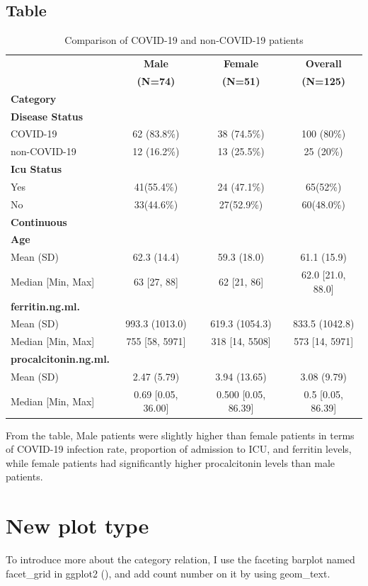 \documentclass[a4paper, 12pt, one column]{article}
\begin{document}
\subsection{Table}
\begin{table}[h!]
\centering
\caption*{Comparison of COVID-19 and non-COVID-19 patients}
\begin{tabular}{lccc}
\toprule
& \textbf{Male} & \textbf{Female} & \textbf{Overall} \\
 & \textbf{(N=74)} & \textbf{(N=51)} & \textbf{(N=125)} \\
\textbf{Category} & & &\\
\midrule
 \textbf{Disease Status} & & &\\
\midrule
COVID-19 & 62 (83.8\%)& 38 (74.5\%) & 100 (80\%) \\
non-COVID-19 & 12 (16.2\%)& 13 (25.5\%) & 25 (20\%) \\
\midrule
\textbf{Icu Status} & & & \\
Yes& 41(55.4\%)& 24 (47.1\%)& 65(52\%)\\
No& 33(44.6\%)& 27(52.9\%)& 60(48.0\%)\\
\midrule
\textbf{Continuous} & & &\\
\midrule
\textbf{Age} & & & \\
Mean (SD) & 62.3 (14.4) & 59.3 (18.0) & 61.1 (15.9) \\
Median [Min, Max] & 63 [27, 88] & 62 [21, 86] & 62.0 [21.0, 88.0] \\
\midrule
\textbf{ferritin.ng.ml.} & & & \\
Mean (SD) & 993.3 (1013.0)& 619.3 (1054.3)& 833.5 (1042.8)\\
Median [Min, Max] & 755 [58, 5971]& 318 [14, 5508]& 573 [14, 5971]\\
\midrule
\textbf{procalcitonin.ng.ml.} & & & \\
Mean (SD) & 2.47 (5.79)& 3.94 (13.65)& 3.08 (9.79)\\
Median [Min, Max] & 0.69 [0.05, 36.00]& 0.500 [0.05, 86.39]& 0.5 [0.05, 86.39]\\
\bottomrule
\end{tabular}
\end{table}
From the table, Male patients were slightly higher than female patients in terms of COVID-19 infection rate, proportion of admission to ICU, and ferritin levels, while female patients had significantly higher procalcitonin levels than male patients.
\newpage

\section{New plot type}
To introduce more about the category relation, I use the faceting barplot named facet\_grid in ggplot2 (\cite{ggplot2_2024}), and add count number on it by using geom\_text.
\end{document}
